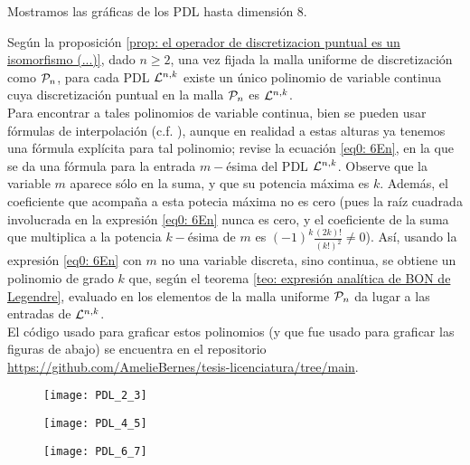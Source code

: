 Mostramos las gráficas de los PDL hasta dimensión $8$.
 
\begin{nota}
Según la proposición 
\ref{prop: el operador de discretizacion puntual es un isomorfismo (...)},
dado $n \geq 2$,
una vez fijada la malla uniforme de discretización
como $\mathcal{P}_{n}$,
para cada PDL $\mathcal{L}^{n,k}$
existe un único polinomio de variable
continua cuya discretización puntual en la
malla $\mathcal{P}_{n}$ es $\mathcal{L}^{n,k}$. \\
Para encontrar a 
tales polinomios 
de variable continua, bien se pueden usar
fórmulas de interpolación (c.f. 
\cite{interpolation}), aunque en realidad
a estas alturas ya tenemos una fórmula explícita 
para tal polinomio; revise la ecuación
\eqref{eq0: 6En}, en la que se da una fórmula
para la entrada $m-$ésima del
PDL $\mathcal{L}^{n,k}$. Observe que la 
variable $m$ aparece sólo en la suma, 
y que su potencia máxima es
$k$. Además, el coeficiente que acompaña
a esta potecia máxima no es cero (pues la raíz
cuadrada involucrada en la
expresión \eqref{eq0: 6En} nunca es cero,
y el coeficiente de la suma que multiplica
a la potencia $k-$ésima de $m$ es
$(-1)^{k} \frac{(2k)!}{(k!)^{2}} \neq 0$). 
Así, usando la expresión 
\eqref{eq0: 6En} con $m$ no una variable discreta,
sino continua, se obtiene un polinomio
de grado $k$ que, según el teorema 
\ref{teo: expresión analítica de BON de Legendre}, evaluado
en los elementos de la malla uniforme $\mathcal{P}_{n}$
da lugar a las entradas de $\mathcal{L}^{n,k}$. \\

El código usado  para graficar estos polinomios
(y que fue usado para graficar las figuras de abajo)
se encuentra en el repositorio
\url{https://github.com/AmelieBernes/tesis-licenciatura/tree/main}.
\end{nota} 
 
\begin{figure}[H]
 	\centering
 	\texttt{[image: PDL\_2\_3]} 
 \end{figure}	 
 \begin{figure}[H]
 	\centering
 	\texttt{[image: PDL\_4\_5]} 
 \end{figure}	
 \begin{figure}[H]
 	\centering
 	\texttt{[image: PDL\_6\_7]} 
 \end{figure}	